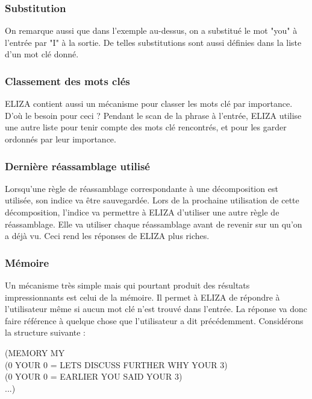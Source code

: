 \documentclass[11pt,a4paper]{report}
\begin{document}
  \subsubsection*{Substitution}
  On remarque aussi que dans l'exemple au-dessus, on a substitué le mot "you" à l'entrée par "I"
  à la sortie. De telles substitutions sont aussi définies dans la liste d'un mot clé donné.  
  
  \subsubsection*{Classement des mots clés}
  ELIZA contient aussi un mécanisme pour classer les mots clé par importance. D'où le besoin 
  pour ceci ?  Pendant le scan de la phrase à l'entrée, 
  ELIZA utilise une autre liste pour tenir compte des mots clé rencontrés, et pour les garder 
  ordonnés par leur importance.
  
  \subsubsection*{Dernière réassamblage utilisé}
  Lorsqu'une règle de réassamblage correspondante à une décomposition 
  est utilisée, son indice va être sauvegardée. 
  Lors de la prochaine utilisation de cette décomposition, l'indice 
  va permettre à ELIZA d'utiliser une autre règle de réassamblage. 
  Elle va utiliser chaque réassamblage avant de revenir sur un qu'on a déjà vu. 
  Ceci rend les réponses de ELIZA plus riches.
  
  \subsubsection*{Mémoire}
  Un mécanisme très simple mais qui pourtant produit des résultats impressionnants est celui 
  de la mémoire. Il permet à ELIZA de répondre à l'utilisateur même si aucun mot clé n'est trouvé 
  dans l'entrée. La réponse va donc faire référence à quelque chose que l'utilisateur a dit 
  précédemment. Considérons la structure suivante : 

  \begin{center}
    (MEMORY MY \\
    (0 YOUR 0 = LETS DISCUSS FURTHER WHY YOUR 3) \\
    (0 YOUR 0 = EARLIER YOU SAID YOUR 3) \\
    ...)
  \end{center}
\end{document}
